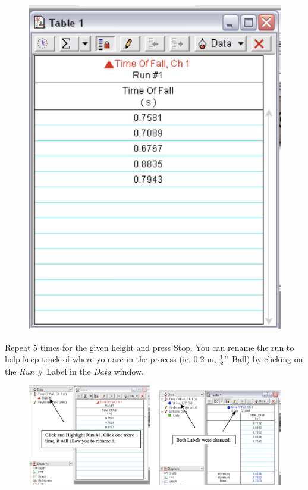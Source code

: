 \begin{figure}[ht]
  \centerline{\includegraphics[scale=0.6]{resources/photo7.jpg}}
\end{figure}

  \newpage Repeat 5 times for the given height and press Stop. You can rename 
the run to help keep track of where you are in the process (ie. 0.2 m, $\frac{1}{2}"$ 
Ball) by clicking on the \emph{Run} \# Label in the \emph{Data} window.

\begin{figure}[ht]
  \centerline{\includegraphics[scale=0.45]{resources/photo8.jpg}}
  \end{figure}

